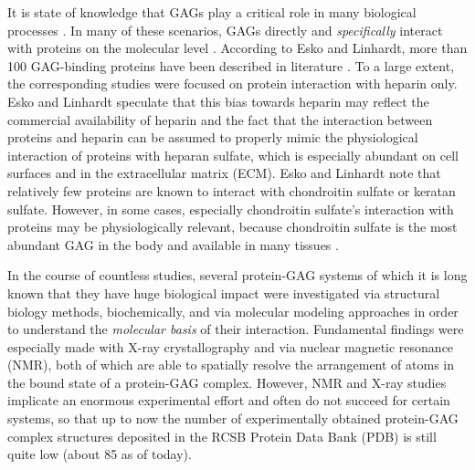 It is state of knowledge that GAGs play a critical role in many biological
processes \cite{handel_2005}. In many of these scenarios, GAGs directly and
\textit{specifically} interact with proteins on the molecular level
\cite{prot_gags_glycomics_review_2006}. According to Esko and Linhardt, more
than 100 GAG-binding proteins have been described in literature
\cite{essentials_glycobiology_protgags_2009}. To a large extent, the
corresponding studies were focused on protein interaction with heparin only.
Esko and Linhardt speculate that this bias towards heparin may reflect the
commercial availability of heparin and the fact that the interaction between
proteins and heparin can be assumed to properly mimic the physiological
interaction of proteins with heparan sulfate, which is especially abundant on
cell surfaces and in the extracellular matrix (ECM). Esko and Linhardt note that
relatively few proteins are known to interact with chondroitin sulfate or
keratan sulfate. However, in some cases, especially chondroitin sulfate's
interaction with proteins may be physiologically relevant, because chondroitin
sulfate is the most abundant GAG in the body
\cite{gandhi_structure_2008} and available in many tissues
\cite{essentials_glycobiology_protgags_2009}.

In the course of countless studies, several protein-GAG systems of which it is
long known that they have huge biological impact were investigated via
structural biology methods, biochemically, and via molecular modeling approaches
in order to understand the \textit{molecular basis} of their interaction.
Fundamental findings were especially made with X-ray crystallography and via
nuclear magnetic resonance (NMR), both of which are able to spatially resolve
the arrangement of atoms in the bound state of a protein-GAG complex. However,
NMR and X-ray studies implicate an enormous experimental effort and often do not
succeed for certain systems, so that up to now the number of experimentally
obtained protein-GAG complex structures deposited in the RCSB Protein Data Bank
(PDB) is still quite low (about 85 as of today).



